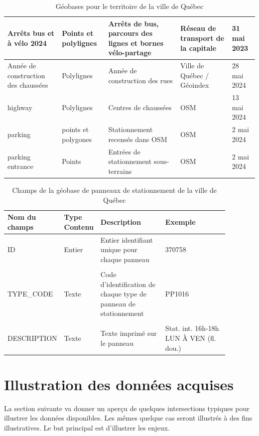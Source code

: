 \begin{landscape}
\begin{table}[h!]
\begin{tabular}{p{.2 \linewidth} l p{.3 \linewidth} p{.15\linewidth} l }
   \hline
   Arrêts bus et à vélo 2024 & Points et polylignes & Arrêts de bus, parcours des lignes et bornes vélo-partage & Réseau de transport de la capitale & 31 mai 2023 \\
   \hline
   Année de construction des chaussées & Polylignes & Année de construction des rues & Ville de Québec / Géoindex & 28 mai 2024 \\
   \hline
   highway & Polylignes & Centres de chaussées & \ac{OSM} & 13 mai 2024\\
   \hline
   parking & points et polygones & Stationnement recensés dans \ac{OSM} & \ac{OSM} & 2 mai 2024 \\
   \hline
    parking entrance & Points & Entrées de stationnement sous-terrains  & \ac{OSM} & 2 mai 2024 \\
    \hline
   \end{tabular}
   \caption{Géobases pour le territoire de la ville de Québec}
   \label{tab:donnees_disponibles_Québec}
\end{table}

\begin{table}[h!]
  \centering
   \begin{tabular}{p{0.18\linewidth} | p{0.1\linewidth} | p{0.3\linewidth} | p{0.3\linewidth}} 
   \hline
   Nom du champs & Type Contenu & Description  & Exemple\\ 
   \hline
   ID             & Entier    & Entier identifiant unique pour chaque panneau  & 370758 \\ 
   & & & \\
   TYPE\_CODE      & Texte     & Code d'identification de chaque type de panneau de stationnement & PP1016\\
   & & & \\
   DESCRIPTION     & Texte     & Texte imprimé sur le panneau & Stat. int. 16h-18h LUN À VEN (fl. dou.)\\
   \hline
   \end{tabular}
   \caption{Champs de la géobase de panneaux de stationnement de la ville de Québec \parencite{VilledeQuebec:PanneauxSignalisation:2024}}
   \label{tab:champs_geobase_stationnement_quebec}
\end{table}
\end{landscape}

\section{Illustration des données acquises}
La section suivante va donner un aperçu de quelques intersections typiques pour illustrer les données disponibles. Les mêmes quelque cas seront illustrés à des fins illustratives. Le but principal est d'illustrer les enjeux.
